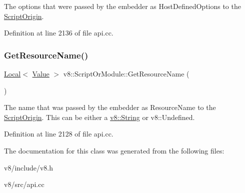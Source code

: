 The options that were passed by the embedder as Host\+Defined\+Options to the \mbox{\hyperlink{classv8_1_1ScriptOrigin}{Script\+Origin}}. 

Definition at line 2136 of file api.\+cc.

\mbox{\label{classv8_1_1ScriptOrModule_a024fd24a2bf984ae22a274be30453871}} 
\subsubsection{\texorpdfstring{Get\+Resource\+Name()}{GetResourceName()}}
{\footnotesize\ttfamily \mbox{\hyperlink{classv8_1_1Local}{Local}}$<$ \mbox{\hyperlink{classv8_1_1Value}{Value}} $>$ v8\+::\+Script\+Or\+Module\+::\+Get\+Resource\+Name (\begin{DoxyParamCaption}{ }\end{DoxyParamCaption})}

The name that was passed by the embedder as Resource\+Name to the \mbox{\hyperlink{classv8_1_1ScriptOrigin}{Script\+Origin}}. This can be either a \mbox{\hyperlink{classv8_1_1String}{v8\+::\+String}} or v8\+::\+Undefined. 

Definition at line 2128 of file api.\+cc.



The documentation for this class was generated from the following files\+:\begin{DoxyCompactItemize}
\item 
v8/include/v8.\+h\item 
v8/src/api.\+cc\end{DoxyCompactItemize}
